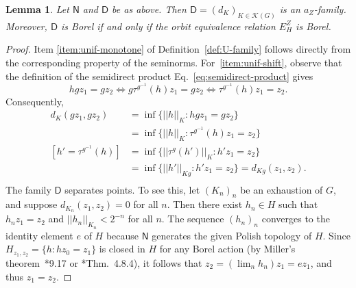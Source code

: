 \documentclass[12pt]{paper}
\numberwithin{equation}{section}
\theoremstyle{plain}
\newtheorem{lemma}[theorem]{Lemma}
\theoremstyle{definition}
\newcommand{\vietoris}[2][]{\mathcal{K}_{#1}(#2)}
\newcommand{\unifm}{\mathsf{D}}
\newcommand{\unifn}{\mathsf{N}}
\newcommand{\norm}[1]{||#1||}
\begin{document}
\begin{lemma}
  \label{lem:invariant-uniformizes}
  Let \(\unifn\) and \(\unifm\) be as above.  Then \(\unifm = (d_{K})_{K \in \vietoris{G}}\) is an
  \(a_{Z}\)-family.  Moreover, \(\unifm\) is Borel if and only if the orbit equivalence relation
  \(E^{Z}_{H}\) is Borel.
\end{lemma}

\begin{proof}
  Item \eqref{item:unif-monotone} of Definition~\ref{def:U-family} follows directly from the
  corresponding property of the seminorms.  For~\eqref{item:unif-shift}, observe that the definition
  of the semidirect product Eq.~\eqref{eq:semidirect-product} gives
  \[hgz_{1} = gz_{2} \iff g\tau^{g^{-1}}(h)z_{1} = gz_{2} \iff \tau^{g^{-1}}(h)z_{1} = z_{2}.\]
  Consequently,
  \begin{displaymath}
    \begin{aligned}
      d_{K}(gz_{1},gz_{2})
      &= \inf\{ \norm{h}_{K} : hgz_{1} = gz_{2}\} \\
      &= \inf\{ \norm{h}_{K} : \tau^{g^{-1}}(h)z_{1} = z_{2}\} \\
      [h' = \tau^{g^{-1}}(h)]
      &= \inf\{ \norm{\tau^{g}(h')}_{K} : h'z_{1} = z_{2}\} \\
      &= \inf\{ \norm{h'}_{Kg} : h'z_{1} =z_{2}\} = d_{Kg}(z_{1},z_{2}). \\
    \end{aligned}
  \end{displaymath}
  The family \(\unifm\) separates points.  To see this, let \((K_{n})_{n}\) be an exhaustion of
  \(G\), and suppose \(d_{K_{n}}(z_{1},z_{2}) = 0 \) for all \(n\).  Then there exist
  \(h_{n} \in H\) such that \(h_{n}z_{1} = z_{2}\) and \(\norm{h_{n}}_{K_{n}} < 2^{-n}\) for all
  \(n\).  The sequence \((h_{n})_{n}\) converges to the identity element \(e\) of \(H\) because
  \(\unifn\) generates the given Polish topology of \(H\).  Since
  \(H_{z_{1},z_{2}} = \{h : hz_{0} = z_{1}\}\) is closed in \(H\) for any Borel action (by Miller's
  theorem~\cite{Kechris}*{9.17} or \cite{MR1619545}*{Thm.~4.8.4}), it follows that
  \(z_{2} = (\lim_{n}h_{n})z_{1} = ez_{1} \), and thus \(z_{1} = z_{2}\).


\end{proof}
\end{document}
